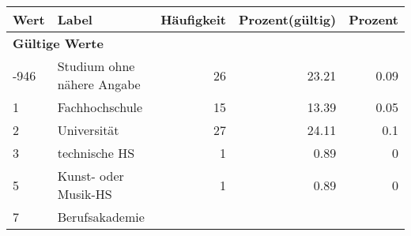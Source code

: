      \begin{longtable}{lXrrr}
     \toprule
     \textbf{Wert} & \textbf{Label} & \textbf{Häufigkeit} & \textbf{Prozent(gültig)} & \textbf{Prozent} \\
     \endhead
     \midrule
     \multicolumn{5}{l}{\textbf{Gültige Werte}}\\

     -946 &
     \multicolumn{1}{X}{ Studium ohne nähere Angabe   } &


       \num{26} &
       \num[round-mode=places,round-precision=2]{23.21} &
         \num[round-mode=places,round-precision=2]{0.09} \\

     1 &
     \multicolumn{1}{X}{ Fachhochschule   } &


       \num{15} &
       \num[round-mode=places,round-precision=2]{13.39} &
         \num[round-mode=places,round-precision=2]{0.05} \\

     2 &
     \multicolumn{1}{X}{ Universität   } &


       \num{27} &
       \num[round-mode=places,round-precision=2]{24.11} &
         \num[round-mode=places,round-precision=2]{0.1} \\

     3 &
     \multicolumn{1}{X}{ technische HS   } &


       \num{1} &
       \num[round-mode=places,round-precision=2]{0.89} &
         \num[round-mode=places,round-precision=2]{0} \\

     5 &
     \multicolumn{1}{X}{ Kunst- oder Musik-HS   } &


       \num{1} &
       \num[round-mode=places,round-precision=2]{0.89} &
         \num[round-mode=places,round-precision=2]{0} \\

     7 &
     \multicolumn{1}{X}{ Berufsakademie   } &



\end{longtable}
